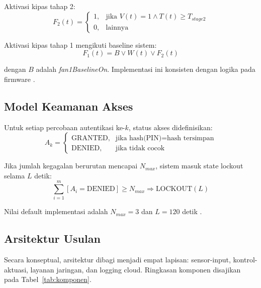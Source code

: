 \documentclass[10pt,a4paper,twocolumn]{article}
\begin{document}
Aktivasi kipas tahap 2:
\begin{equation}
F_2(t)=
\begin{cases}
1,& \text{jika } V(t)=1 \land T(t)\ge T_{stage2}\\
0,& \text{lainnya}
\end{cases}
\end{equation}

Aktivasi kipas tahap 1 mengikuti baseline sistem:
\begin{equation}
F_1(t)=B \lor W(t) \lor F_2(t)
\end{equation}

dengan $B$ adalah \textit{fan1BaselineOn}. Implementasi ini konsisten dengan logika pada firmware \cite{repo_firmware_2026}.

\subsection{Model Keamanan Akses}
Untuk setiap percobaan autentikasi ke-$k$, status akses didefinisikan:
\begin{equation}
A_k=
\begin{cases}
\text{GRANTED},& \text{jika hash(PIN)}=\text{hash tersimpan}\\
\text{DENIED},& \text{jika tidak cocok}
\end{cases}
\end{equation}

Jika jumlah kegagalan berurutan mencapai $N_{max}$, sistem masuk state lockout selama $L$ detik:
\begin{equation}
\sum_{i=1}^{m} [A_i=\text{DENIED}] \ge N_{max} \Rightarrow \text{LOCKOUT}(L)
\end{equation}

Nilai default implementasi adalah $N_{max}=3$ dan $L=120$ detik \cite{repo_firmware_2026}.

\subsection{Arsitektur Usulan}
Secara konseptual, arsitektur dibagi menjadi empat lapisan: sensor-input, kontrol-aktuasi, layanan jaringan, dan logging cloud. Ringkasan komponen disajikan pada Tabel~\ref{tab:komponen}.
\end{document}
